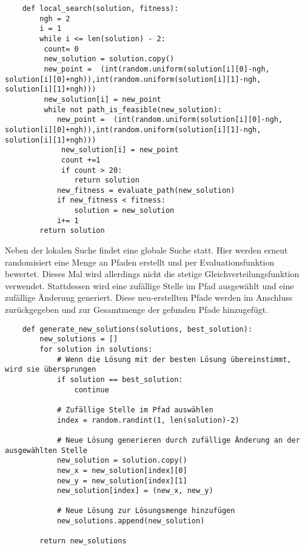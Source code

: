 \begin{verbatim}
    def local_search(solution, fitness):
        ngh = 2
        i = 1
        while i <= len(solution) - 2:
         count= 0
         new_solution = solution.copy()
         new_point =  (int(random.uniform(solution[i][0]-ngh, solution[i][0]+ngh)),int(random.uniform(solution[i][1]-ngh, solution[i][1]+ngh)))
         new_solution[i] = new_point
         while not path_is_feasible(new_solution):
            new_point =  (int(random.uniform(solution[i][0]-ngh, solution[i][0]+ngh)),int(random.uniform(solution[i][1]-ngh, solution[i][1]+ngh)))
             new_solution[i] = new_point 
             count +=1
             if count > 20:
                return solution
            new_fitness = evaluate_path(new_solution)
            if new_fitness < fitness:
                solution = new_solution
            i+= 1
        return solution
\end{verbatim}
\vspace*{-3mm}
\vspace*{3mm}

Neben der lokalen Suche findet eine globale Suche statt. Hier werden erneut randomisiert eine Menge an Pfaden erstellt und per Evaluationsfunktion bewertet. Dieses Mal wird allerdings nicht die stetige Gleichverteilungsfunktion verwendet. Stattdessen wird eine zufällige Stelle im Pfad ausgewählt und eine zufällige Änderung generiert. Diese neu-erstellten Pfade werden im Anschluss zurückgegeben und zur Gesamtmenge der gefunden Pfade hinzugefügt.

\begin{verbatim}
    def generate_new_solutions(solutions, best_solution):
        new_solutions = []
        for solution in solutions:
            # Wenn die Lösung mit der besten Lösung übereinstimmt, wird sie übersprungen
            if solution == best_solution:
                continue
            
            # Zufällige Stelle im Pfad auswählen
            index = random.randint(1, len(solution)-2)
            
            # Neue Lösung generieren durch zufällige Änderung an der ausgewählten Stelle
            new_solution = solution.copy()
            new_x = new_solution[index][0] 
            new_y = new_solution[index][1] 
            new_solution[index] = (new_x, new_y)
            
            # Neue Lösung zur Lösungsmenge hinzufügen
            new_solutions.append(new_solution)
        
        return new_solutions
\end{verbatim}
\vspace*{-3mm}
\vspace*{3mm}

